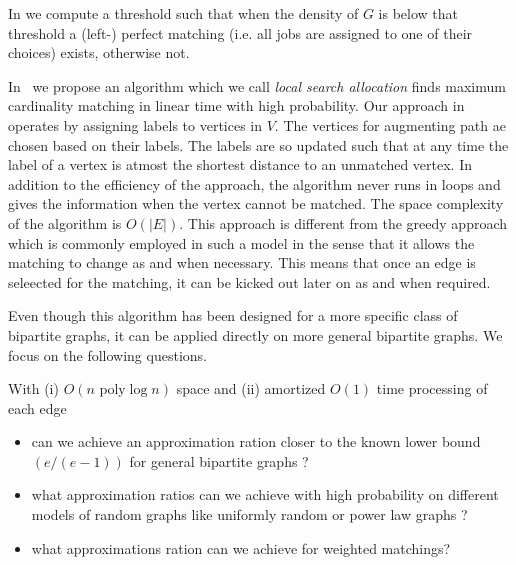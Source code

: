 \documentclass{scrartcl}
\begin{document}
In \cite{kCores} we compute a threshold such that when the density of $G$ is below that threshold a (left-) perfect matching (i.e. all jobs are assigned to one of their choices) exists, otherwise not.
%

In~\cite{ballsbins} we propose an algorithm which we call \emph{local search allocation} finds maximum cardinality matching in linear time with high probability.
Our approach in~\cite{ballsbins} operates by assigning labels to vertices in $V$. The vertices for augmenting path ae chosen based on their labels. The labels are so updated such that at any time the label of a vertex is atmost the shortest distance to an unmatched vertex. In addition to the efficiency of the approach, the algorithm never runs in loops and gives the information when the vertex cannot be matched. The space complexity of the algorithm is $O(|E|)$. This approach is different from the greedy approach which is commonly employed in such a model in the sense that it allows the matching to change as and when necessary. This means that once an edge is seleected for the matching, it can be kicked out later on as and when required.

Even though this algorithm has been designed for a more specific class of bipartite graphs, it can be applied directly on more general bipartite graphs. We focus on the following questions.

With (i) $O(n \text{ poly} \log n)$ space and  (ii) amortized $O(1)$ time processing of each edge
\begin{itemize}
\item  can we achieve an approximation ration closer to the known lower bound $(e/(e-1))$ for general bipartite graphs ?
\item what approximation ratios can we achieve with high probability on different models of random graphs like uniformly random or power law graphs ?
\item what approximations ration can we achieve for weighted matchings?

\end{itemize}
\end{document}
